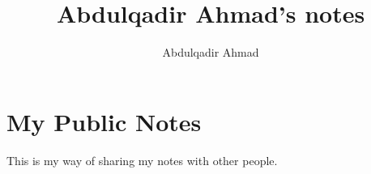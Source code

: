 \documentclass{article}
\title{Abdulqadir Ahmad's notes}
\author{Abdulqadir Ahmad}
\begin{document}
\maketitle
\tableofcontents
\section{My Public Notes}
This is my way of sharing my notes with other people.

\end{document}

